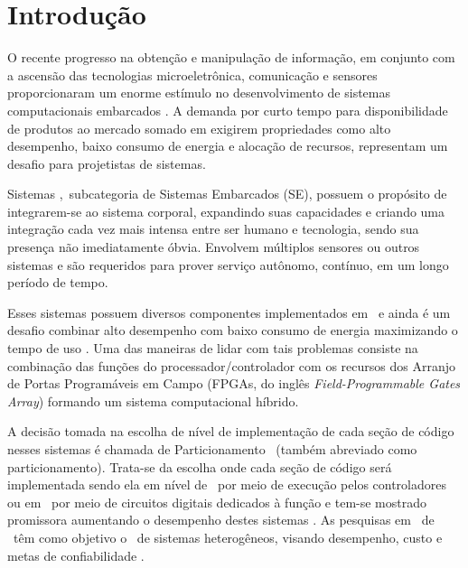 \chapter{Introdução} \label{chap:introducao}
    
    
    
    O recente progresso na obtenção e manipulação de informação, em conjunto com a ascensão das tecnologias microeletrônica, comunicação e sensores proporcionaram um enorme estímulo no desenvolvimento de sistemas computacionais embarcados \citep{Jozwiak2017}.
    A demanda por curto tempo para disponibilidade de produtos ao mercado somado em exigirem propriedades como alto desempenho, baixo consumo de energia e alocação de recursos, representam um desafio para projetistas de sistemas.%
    
    Sistemas \Wearables,\ subcategoria de Sistemas Embarcados (SE), possuem o propósito de integrarem-se ao sistema corporal, expandindo suas capacidades e criando uma integração cada vez mais intensa entre ser humano e tecnologia, sendo sua presença não imediatamente óbvia.
    Envolvem múltiplos sensores ou outros sistemas e são requeridos para prover serviço autônomo, contínuo, em um longo período de tempo.
    
    Esses sistemas possuem diversos componentes implementados em \hs\ e ainda é um desafio combinar alto desempenho com baixo consumo de energia maximizando o tempo de uso \citep{Wolf1994, Edwards1994}.
    Uma das maneiras de lidar com tais problemas consiste na combinação das funções do processador/controlador com os recursos dos Arranjo de Portas Programáveis em Campo (FPGAs, do inglês \textit{Field-Programmable Gates Array}) formando um sistema computacional híbrido.
    
    
    A decisão tomada na escolha de nível de implementação de cada seção de código nesses sistemas é chamada de Particionamento \HS\ (também abreviado como particionamento). 
    Trata-se da escolha onde cada seção de código será implementada sendo ela em nível de \software\ por meio de execução pelos controladores ou em \hardware\ por meio de circuitos digitais dedicados à função e tem-se mostrado promissora aumentando o desempenho destes sistemas \citep{Sass2010, BenHajHassine2017}.
    As pesquisas em \codesign\ de \hs\ têm como objetivo o \design\ de sistemas heterogêneos, visando desempenho, custo e metas de confiabilidade \citep{Edwards1994}.
    

